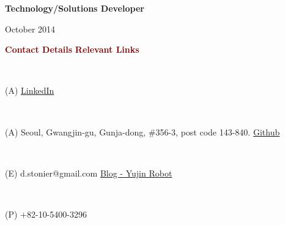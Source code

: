 \documentclass[a4paper,10pt]{article}
\begin{document}

\begin{center}
  \textbf{Technology/Solutions Developer} \\
  \begin{small} October 2014 \end{small}
\end{center}


\itshape
\begin{small} \textcolor{maroon}{\textbf{Contact Details}} \hfill \textcolor{maroon}{\textbf{Relevant Links}} \end{small}  \\ 
\begin{small} (A)  \hfill \href{http://kr.linkedin.com/pub/daniel-stonier/22/375/95b}{LinkedIn}  \end{small}  \\ 
\begin{small} (A) Seoul, Gwangjin-gu, Gunja-dong, \#356-3, post code 143-840. \hfill \href{https://github.com/stonier}{Github} \end{small} \\  
\begin{small} (E) d.stonier@gmail.com \hfill \href{http://blog.yujinrobot.com/}{Blog - Yujin Robot} \end{small} \\
\begin{small} (P) +82-10-5400-3296 \hfill \end{small} \\
\rmfamily
\end{document}
